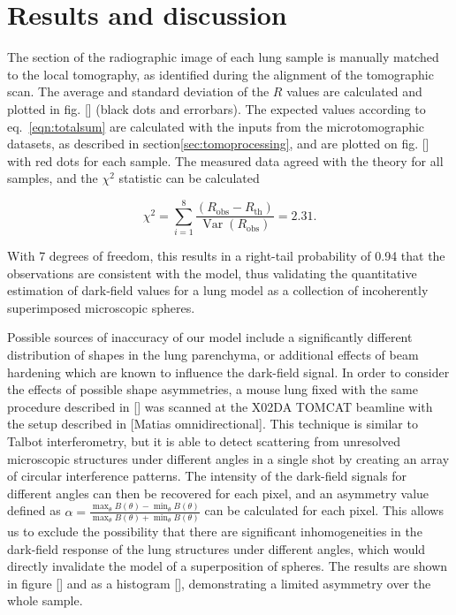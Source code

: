 \section{Results and discussion}\label{sec:results}
The section of the radiographic image of each lung sample is manually
matched to the local tomography, as identified during the alignment of the
tomographic scan. The average and standard deviation of the $R$ values are
calculated and plotted in fig. [] (black dots and errorbars). The expected
values according to eq.~\ref{eqn:totalsum} are calculated with the inputs from the
microtomographic datasets, as described in section\ref{sec:tomoprocessing}, and are plotted on
fig. [] with red dots for each sample. The measured data agreed with the
theory for all samples, and the $\chi^2$ statistic can be calculated

\begin{equation}
    \chi^2 = \sum_{i=1}^8 \dfrac{(R_{\text{obs}} -
    R_{\text{th}})}{\mathop{Var}(R_{\text{obs}})} = 2.31.
    \label{eqn:chisq}
\end{equation}

With 7 degrees of freedom, this results in a right-tail probability of 0.94 that the 
observations are consistent with the model, thus validating the quantitative estimation of
dark-field values for a lung model as a collection of incoherently
superimposed microscopic spheres.

Possible sources of inaccuracy of our model include a significantly
different distribution of shapes in the lung parenchyma, or additional
effects of beam hardening which are known to influence the dark-field
signal. In order to consider the effects of possible shape asymmetries, a
mouse lung fixed with the same procedure described in [] was scanned at the
X02DA TOMCAT beamline with the setup described in [Matias omnidirectional].
This technique is similar to Talbot interferometry, but it is able to detect
scattering from unresolved microscopic structures under different angles in
a single shot by
creating an array of circular interference patterns. The intensity of the
dark-field signals for different angles can then be recovered for each
pixel, and an asymmetry value defined as $\alpha =
\frac{\max_\theta{B(\theta)} -
\min_\theta{B(\theta)}}{\max_\theta{B(\theta)} + \min_\theta{B(\theta)}}$
can be calculated for each pixel. This allows us to exclude the possibility
that there are significant inhomogeneities in the dark-field response of the
lung structures under different angles, which would directly invalidate the
model of a superposition of spheres. The results are shown in figure [] and
as a histogram [], demonstrating a limited asymmetry over the whole sample.

